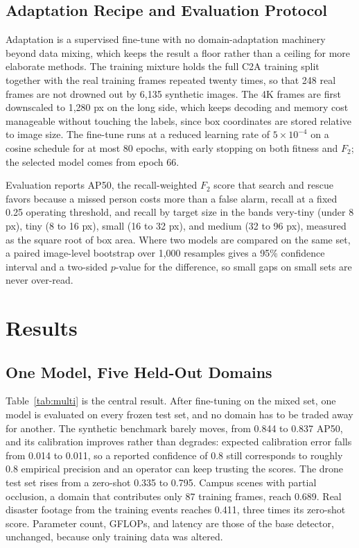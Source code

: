 \documentclass[conference,a4paper]{IEEEtran}
\begin{document}
\subsection{Adaptation Recipe and Evaluation Protocol}
Adaptation is a supervised fine-tune with no domain-adaptation machinery beyond
data mixing, which keeps the result a floor rather than a ceiling for more
elaborate methods. The training mixture holds the full C2A training split
together with the real training frames repeated twenty times, so that 248 real
frames are not drowned out by 6,135 synthetic images. The 4K frames are first
downscaled to 1,280 px on the long side, which keeps decoding and memory cost
manageable without touching the labels, since box coordinates are stored
relative to image size. The fine-tune runs at a reduced learning rate of
$5\times10^{-4}$ on a cosine schedule for at most 80 epochs, with early
stopping on both fitness and $F_2$; the selected model comes from epoch 66.

Evaluation reports AP50, the recall-weighted $F_2$ score that search and rescue
favors because a missed person costs more than a false alarm, recall at a fixed
0.25 operating threshold, and recall by target size in the bands very-tiny
(under 8 px), tiny (8 to 16 px), small (16 to 32 px), and medium (32 to 96 px),
measured as the square root of box area. Where two models are compared on the
same set, a paired image-level bootstrap over 1,000 resamples gives a 95\%
confidence interval and a two-sided $p$-value for the difference, so small gaps
on small sets are never over-read.

\section{Results}

\subsection{One Model, Five Held-Out Domains}
Table~\ref{tab:multi} is the central result. After fine-tuning on the mixed
set, one model is evaluated on every frozen test set, and no domain has to be
traded away for another. The synthetic benchmark barely moves, from 0.844 to
0.837 AP50, and its calibration improves rather than degrades: expected
calibration error falls from 0.014 to 0.011, so a reported confidence of 0.8
still corresponds to roughly 0.8 empirical precision and an operator can keep
trusting the scores. The drone test set rises from a zero-shot 0.335 to 0.795.
Campus scenes with partial occlusion, a domain that contributes only 87
training frames, reach 0.689. Real disaster footage from the training events
reaches 0.411, three times its zero-shot score. Parameter count, GFLOPs, and
latency are those of the base detector, unchanged, because only training data
was altered.
\end{document}
